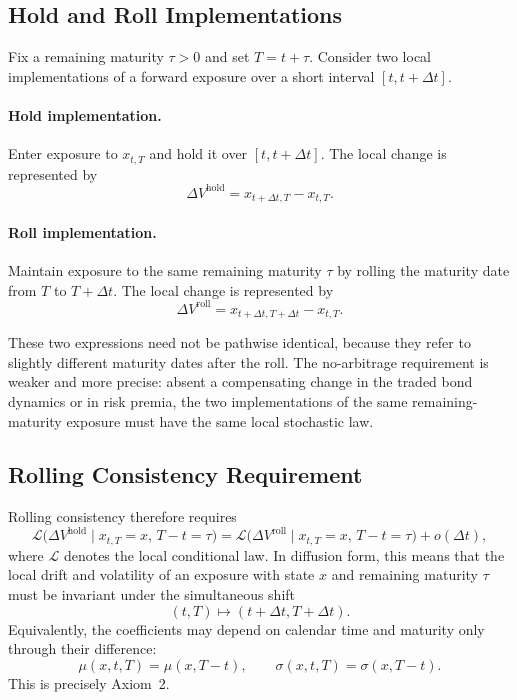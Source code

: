 \documentclass[12pt]{article}
\theoremstyle{statementstyle}
\begin{document}
\begin{appendices}
\subsection{Hold and Roll Implementations}
\label{D.3}

Fix a remaining maturity \(\tau>0\) and set \(T=t+\tau\). Consider two local
implementations of a forward exposure over a short interval \([t,t+\Delta t]\).

\paragraph{Hold implementation.}
Enter exposure to \(x_{t,T}\) and hold it over \([t,t+\Delta t]\). The local
change is represented by
\[
\Delta V^{\mathrm{hold}}
=
x_{t+\Delta t,T}-x_{t,T}.
\]

\paragraph{Roll implementation.}
Maintain exposure to the same remaining maturity \(\tau\) by rolling the maturity
date from \(T\) to \(T+\Delta t\). The local change is represented by
\[
\Delta V^{\mathrm{roll}}
=
x_{t+\Delta t,T+\Delta t}-x_{t,T}.
\]

These two expressions need not be pathwise identical, because they refer to
slightly different maturity dates after the roll. The no-arbitrage requirement is
weaker and more precise: absent a compensating change in the traded bond dynamics
or in risk premia, the two implementations of the same remaining-maturity
exposure must have the same local stochastic law.

\subsection{Rolling Consistency Requirement}
\label{D.4}

Rolling consistency therefore requires
\[
\mathcal{L}\!\bigl(\Delta V^{\mathrm{hold}}\mid x_{t,T}=x,\,T-t=\tau\bigr)
=
\mathcal{L}\!\bigl(\Delta V^{\mathrm{roll}}\mid x_{t,T}=x,\,T-t=\tau\bigr)
+
 o(\Delta t),
\]
where \(\mathcal{L}\) denotes the local conditional law. In diffusion form, this
means that the local drift and volatility of an exposure with state \(x\) and
remaining maturity \(\tau\) must be invariant under the simultaneous shift
\[
(t,T)\mapsto(t+\Delta t,T+\Delta t).
\]
Equivalently, the coefficients may depend on calendar time and maturity only
through their difference:
\[
\mu(x,t,T)=\mu(x,T-t),
\qquad
\sigma(x,t,T)=\sigma(x,T-t).
\]
This is precisely Axiom~2.


\end{appendices}
\end{document}
